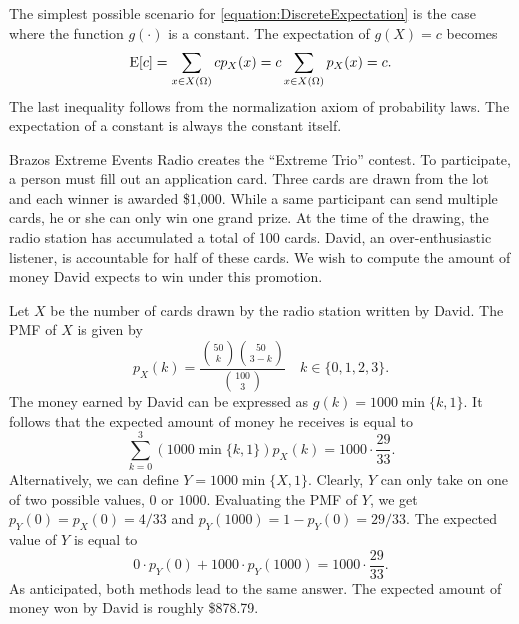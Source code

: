 \begin{example}
The simplest possible scenario for \eqref{equation:DiscreteExpectation} is the case where the function $g(\cdot)$ is a constant.
The expectation of $g(X) = c$ becomes
\begin{equation*}
\mathrm{E} [ c ]
= \sum_{x \in X(\Omega)} c p_X (x)
= c \sum_{x \in X(\Omega)} p_X (x)
= c .
\end{equation*}
The last inequality follows from the normalization axiom of probability laws.
The expectation of a constant is always the constant itself.
\end{example}

\begin{example}
Brazos Extreme Events Radio creates the ``Extreme Trio'' contest.
To participate, a person must fill out an application card.
Three cards are drawn from the lot and each winner is awarded \$1,000.
While a same participant can send multiple cards, he or she can only win one grand prize.
At the time of the drawing, the radio station has accumulated a total of 100 cards.
David, an over-enthusiastic listener, is accountable for half of these cards.
We wish to compute the amount of money David expects to win under this promotion.

Let $X$ be the number of cards drawn by the radio station written by David.
The PMF of $X$ is given by
\begin{equation*}
p_X(k) = \frac{\binom{50}{k} \binom{50}{3-k}}{\binom{100}{3}}
\quad k \in \{ 0, 1, 2, 3 \}.
\end{equation*}
The money earned by David can be expressed as $g(k) = 1000 \min \{ k,1 \}$.
It follows that the expected amount of money he receives is equal to
\begin{equation*}
\sum_{k=0}^3 \left( 1000 \min \{ k, 1 \} \right) p_X(k)
= 1000 \cdot \frac{29}{33} .
\end{equation*}
Alternatively, we can define $Y = 1000 \min \{ X, 1 \}$.
Clearly, $Y$ can only take on one of two possible values, $0$ or $1000$.
Evaluating the PMF of $Y$, we get $p_Y(0) = p_X(0) = 4/33$ and $p_Y(1000) = 1 - p_Y(0) = 29/33$.
The expected value of $Y$ is equal to
\begin{equation*}
0 \cdot p_Y(0) + 1000 \cdot p_Y(1000) = 1000 \cdot \frac{29}{33} .
\end{equation*}
As anticipated, both methods lead to the same answer.
The expected amount of money won by David is roughly \$878.79.
\end{example}


